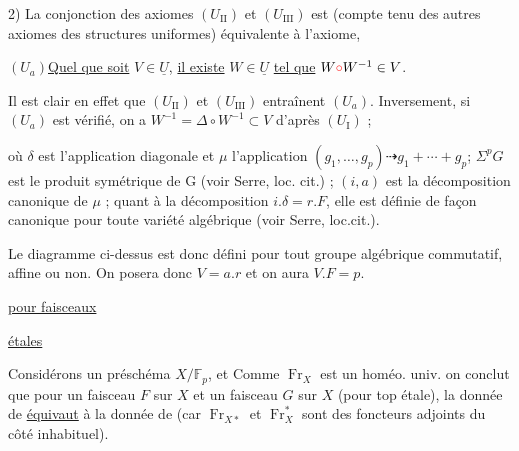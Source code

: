 2) La conjonction des axiomes $(U_{\mathrm{II}})$ et $(U_{\mathrm{III}})$ est (compte tenu des autres axiomes des structures uniformes) équivalente à l'axiome,

$(U_a)$\quad \uline{Quel que soit} $V\in\underline U$, \uline{il existe} $W\in\underline U$ \uline{tel que} $W{\color{red}\circ}W^{-1}\in V$.

Il est clair en effet que $(U_{\mathrm{II}})$ et $(U_{\mathrm{III}})$ entraînent $(U_a)$. Inversement, si $(U_a)$ est vérifié, on a $W^{-1}=\Delta\circ W^{-1}\subset V$ d'après $(U_{\mathrm I})$ ;


où $\delta$ est l'application diagonale et $\mu$ l'application $(g_1,\ldots,g_p)\dashrightarrow g_1+\cdots+g_p$; $\Sigma^pG$ est le produit symétrique de G (voir Serre, loc. cit.) ; $(i,a)$ est la décomposition canonique de $\mu$ ; quant à la décomposition $i.\delta=r.F$, elle est définie de façon canonique pour toute variété algébrique (voir Serre, loc.cit.).

Le diagramme ci-dessus est donc défini pour tout groupe algébrique commutatif, affine ou non. On posera donc $V=a.r$ et on aura $V.F=p$.

\uline{}

\uline{pour faisceaux}

\uline{étales}


\uline{}

Considérons un préschéma $X/\mathbb F_p$, et
Comme $\operatorname{Fr}_X$ est un homéo. univ. on conclut que pour un faisceau $F$ sur $X$ et un faisceau $G$ sur $X$ (pour top étale), la donnée de
\uline{équivaut} à la donnée de
(car $\operatorname{Fr}_{X*}$ et $\operatorname{Fr}_X^*$ sont  des foncteurs adjoints du côté inhabituel).

